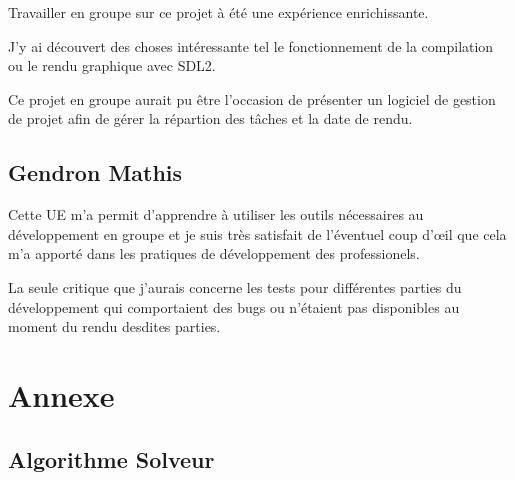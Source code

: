 \documentclass[12pt]{article}
\begin{document}
Travailler en groupe sur ce projet à été une expérience enrichissante.

J'y ai découvert des choses intéressante tel le fonctionnement de la compilation ou le rendu graphique avec SDL2.

Ce projet en groupe aurait pu être l'occasion de présenter un logiciel de gestion de projet afin de gérer la répartion des tâches et la date de rendu.

\subsection{Gendron Mathis}

Cette UE m'a permit d'apprendre à utiliser les outils nécessaires au développement en groupe
et je suis très satisfait de l'éventuel coup d'\oe{}il que cela m'a apporté dans les pratiques
de développement des professionels.

La seule critique que j'aurais concerne les tests pour différentes parties du développement
qui comportaient des bugs ou n'étaient pas disponibles au moment du rendu desdites parties.





\section{Annexe}
\subsection{Algorithme Solveur}
\label{algosolv}

\end{document}
